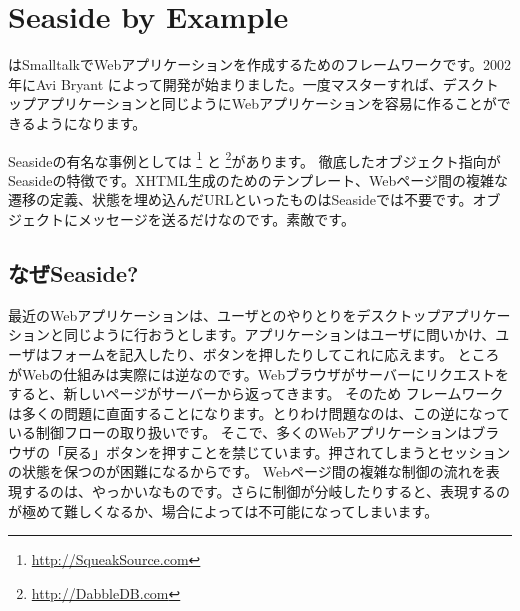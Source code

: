 \documentclass[a4paper,10pt,twoside]{book}
\begin{document}
	\sloppy
\fi
\chapter{Seaside by Example}


 はSmalltalkでWebアプリケーションを作成するためのフレームワークです。2002年にAvi Bryant  によって開発が始まりました。一度マスターすれば、デスクトップアプリケーションと同じようにWebアプリケーションを容易に作ることができるようになります。

Seasideの有名な事例としては \footnote{\url{http://SqueakSource.com}} と \footnote{\url{http://DabbleDB.com}}があります。
徹底したオブジェクト指向がSeasideの特徴です。XHTML生成のためのテンプレート、Webページ間の複雑な遷移の定義、状態を埋め込んだURLといったものはSeasideでは不要です。オブジェクトにメッセージを送るだけなのです。素敵です。

\section{なぜSeaside?}

最近のWebアプリケーションは、ユーザとのやりとりをデスクトップアプリケーションと同じように行おうとします。アプリケーションはユーザに問いかけ、ユーザはフォームを記入したり、ボタンを押したりしてこれに応えます。
ところがWebの仕組みは実際には逆なのです。Webブラウザがサーバーにリクエストをすると、新しいページがサーバーから返ってきます。
そのため フレームワークは多くの問題に直面することになります。とりわけ問題なのは、この逆になっている制御フローの取り扱いです。
そこで、多くのWebアプリケーションはブラウザの「戻る」ボタンを押すことを禁じています。押されてしまうとセッションの状態を保つのが困難になるからです。
Webページ間の複雑な制御の流れを表現するのは、やっかいなものです。さらに制御が分岐したりすると、表現するのが極めて難しくなるか、場合によっては不可能になってしまいます。

\end{document}
